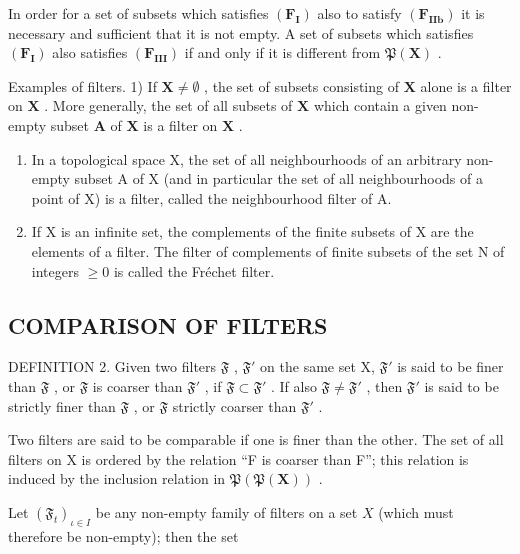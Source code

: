 In order for a set of subsets which satisfies \((\mathbf{F}_{\mathbf{I}})\) also to satisfy \((\mathbf{F}_{\mathbf{II}\mathbf{b}})\) it is necessary and sufficient that it is not empty. A set of subsets which satisfies \((\mathbf{F}_{\mathbf{I}})\) also satisfies \((\mathbf{F}_{\mathbf{III}})\) if and only if it is different from \(\mathfrak{P}(\mathbf{X})\) .

Examples of filters. 1) If \(\mathbf{X} \neq \emptyset\) , the set of subsets consisting of \(\mathbf{X}\) alone is a filter on \(\mathbf{X}\) . More generally, the set of all subsets of \(\mathbf{X}\) which contain a given non-empty subset \(\mathbf{A}\) of \(\mathbf{X}\) is a filter on \(\mathbf{X}\) .

\begin{enumerate}
\def\labelenumi{\arabic{enumi})}
\setcounter{enumi}{1}
\item
  In a topological space X, the set of all neighbourhoods of an arbitrary non-empty subset A of X (and in particular the set of all neighbourhoods of a point of X) is a filter, called the neighbourhood filter of A.
\item
  If X is an infinite set, the complements of the finite subsets of X are the elements of a filter. The filter of complements of finite subsets of the set N of integers \(\geqslant0\) is called the Fréchet filter.
\end{enumerate}

\subsection{COMPARISON OF FILTERS}

DEFINITION 2. Given two filters \(\mathfrak{F}\) , \(\mathfrak{F}'\) on the same set X, \(\mathfrak{F}'\) is said to be finer than \(\mathfrak{F}\) , or \(\mathfrak{F}\) is coarser than \(\mathfrak{F}'\) , if \(\mathfrak{F} \subset \mathfrak{F}'\) . If also \(\mathfrak{F} \neq \mathfrak{F}'\) , then \(\mathfrak{F}'\) is said to be strictly finer than \(\mathfrak{F}\) , or \(\mathfrak{F}\) strictly coarser than \(\mathfrak{F}'\) .

Two filters are said to be comparable if one is finer than the other. The set of all filters on X is ordered by the relation ``F is coarser than F''; this relation is induced by the inclusion relation in \(\mathfrak{P}(\mathfrak{P}(\mathbf{X}))\) .

Let \((\mathfrak{F}_t)_{\iota \in I}\) be any non-empty family of filters on a set \(X\) (which must therefore be non-empty); then the set

